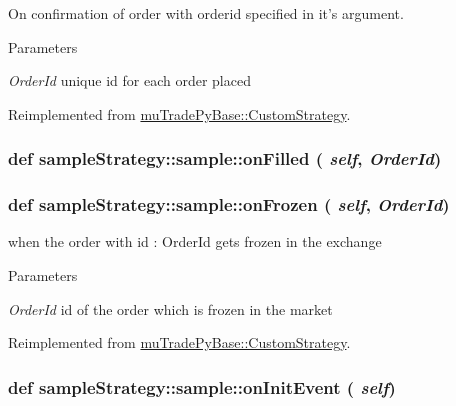 On confirmation of order with orderid specified in it's argument. 
\begin{DoxyParams}{Parameters}
\item[{\em OrderId}]unique id for each order placed \end{DoxyParams}


Reimplemented from \hyperlink{classmuTradePyBase_1_1CustomStrategy_a2d99ec0bbe867655ed7f9373812d7a56}{muTradePyBase::CustomStrategy}.\hypertarget{classsampleStrategy_1_1sample_ac4878fc8589f35e622c2b31b79691c84}{
\subsubsection[{onFilled}]{\setlength{\rightskip}{0pt plus 5cm}def sampleStrategy::sample::onFilled ( {\em self}, \/   {\em OrderId})}}
\label{classsampleStrategy_1_1sample_ac4878fc8589f35e622c2b31b79691c84}
\hypertarget{classsampleStrategy_1_1sample_af7a376b4e20ecd8bc87e339f53b8f932}{
\subsubsection[{onFrozen}]{\setlength{\rightskip}{0pt plus 5cm}def sampleStrategy::sample::onFrozen ( {\em self}, \/   {\em OrderId})}}
\label{classsampleStrategy_1_1sample_af7a376b4e20ecd8bc87e339f53b8f932}


when the order with id : OrderId gets frozen in the exchange 
\begin{DoxyParams}{Parameters}
\item[{\em OrderId}]id of the order which is frozen in the market \end{DoxyParams}


Reimplemented from \hyperlink{classmuTradePyBase_1_1CustomStrategy_a40cb69958575c0a0a7e435d3ac0fe9f9}{muTradePyBase::CustomStrategy}.\hypertarget{classsampleStrategy_1_1sample_a412c1e16766e2af518a879c781dfb70c}{
\subsubsection[{onInitEvent}]{\setlength{\rightskip}{0pt plus 5cm}def sampleStrategy::sample::onInitEvent ( {\em self})}}
\label{classsampleStrategy_1_1sample_a412c1e16766e2af518a879c781dfb70c}


